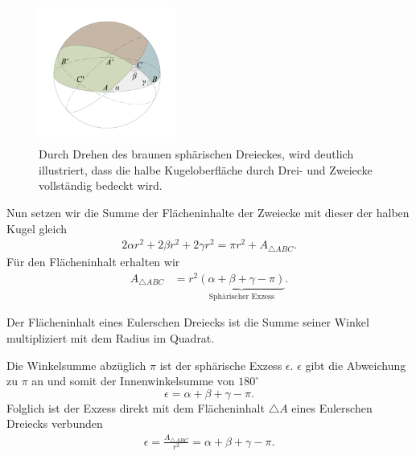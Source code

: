 \begin{refsection}

\begin{figure}[htbp]
\centering
\includegraphics[width=0.4\textwidth]{kugel/HalbeKugel.jpg}
\caption{Durch Drehen des braunen sphärischen Dreieckes, wird
deutlich illustriert, dass die halbe Kugeloberfläche durch Drei-
und Zweiecke vollständig bedeckt wird.}
\label{V9}
\end{figure}

Nun setzen wir die Summe der Flächeninhalte der Zweiecke mit dieser
der halben Kugel gleich
\begin{align*}
2 \alpha r^2 + 2 \beta r^2 + 2 \gamma  r^2 = \pi r^2 + A_{ \triangle{ ABC }}.
\end{align*}
Für den Flächeninhalt erhalten wir
\begin{align*}
A_{ \triangle{ ABC }}
&=
r^{ 2 }\underbrace{(\alpha + \beta + \gamma - \pi)}_{\displaystyle\text{Sphärischer Exzess}}.
\end{align*}

\begin{definition}
Der Flächeninhalt eines Eulerschen Dreiecks ist die Summe seiner
Winkel multipliziert mit dem Radius im Quadrat.
\label{skript:kugel:satz:Flaecheninhalt}
%
\end{definition}


Die Winkelsumme abzüglich $\pi$ ist der sphärische Exzess $\epsilon$.
$\epsilon$ gibt die Abweichung zu $\pi$ an und somit der Innenwinkelsumme
von $180^{\circ}$
\begin{equation}
\epsilon = \alpha + \beta + \gamma - \pi.
\end{equation}
Folglich ist der Exzess direkt mit dem Flächeninhalt $\triangle A$
eines Eulerschen Dreiecks verbunden
\begin{align*}
\epsilon =\frac{A_{\triangle{ ABC }}}{r^2} = {\alpha + \beta + \gamma - \pi}.
\end{align*}


\end{refsection}
